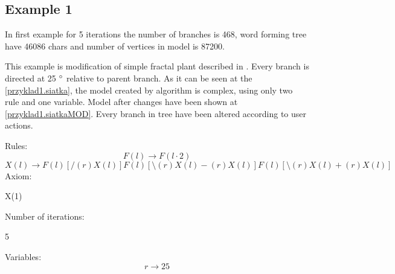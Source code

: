 \documentclass[b5paper,twoside,11pt]{article}
\begin{document}
\subsection*{Example 1}
In first example for 5 iterations the number of branches is 468, word forming tree have 46086 chars and number of vertices in model is 87200.\newline\par
This example is modification of simple fractal plant described in \cite{prusinABOP}.
Every branch is directed at 25  $\degree$ relative to parent branch. As it can be seen at the \figurename \ref{przyklad1.siatka}, the model created by algorithm is complex, using only two rule and one variable. Model after changes have been shown at  \figurename \ref{przyklad1.siatkaMOD}. Every branch in tree have been altered according to user actions.\par 
Rules: \newline
\begin{equation*}
F(l)\rightarrow F(l\cdot2) 
\end{equation*}
\begin{equation*}
X(l) \rightarrow F(l)[/(r)X(l)]F(l)[\setminus(r)X(l)-(r)X(l)]F(l)[\setminus(r)X(l)+(r)X(l)] 
\end{equation*}
Axiom:
\begin{center}
X(1)
\end{center}
Number of iterations:
\begin{center}
5
\end{center}
Variables:
\begin{equation*}
r\rightarrow 25
\end{equation*}
\end{document}
